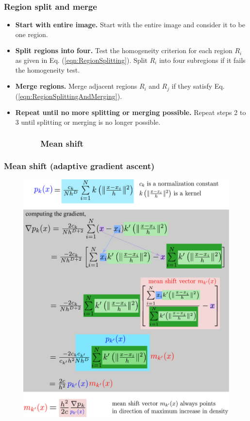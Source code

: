 \begin{frame}
\frametitle{Region split and merge}
\logoCSIPCPL\mypagenum
	\begin{itemize}
		\item \textbf{Start with entire image.}  Start with the entire image and consider it to be one region.
		\item \textbf{Split regions into four.}  Test the homogeneity criterion for each region $R_i$ as given in Eq.
		(\ref{eqn:RegionSplitting}). Split $R_i$ into four subregions if it fails the homogeneity test.
		\item \textbf{Merge regions.}  Merge adjacent regions $R_i$ and $R_j$ if they satisfy Eq. (\ref{eqn:RegionSplittingAndMerging}).
		\item \textbf{Repeat until no more splitting or merging possible.} Repeat steps 2 to 3 until splitting or merging is no longer possible.
	\end{itemize}
\end{frame}





\subsubsection{\ \ \ \ \ \ \ \ Mean shift}
\begin{frame}
\frametitle{Mean shift {\small(adaptive gradient ascent)}}
\logoCSIPCPL\mypagenum
	\begin{figure}				
		\includegraphics[height=.85\textheight]{figs/PRML_meanShift.pdf}
	\end{figure}
\end{frame}



